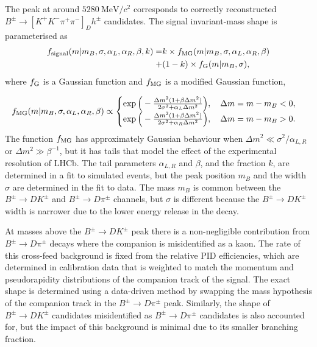 \documentclass[12pt, a4paper, notitlepage, onecolumn]{article}
\begin{document}
The peak at around $\SI{5280}{\mega\eV/c^2}$ corresponds to correctly reconstructed $B^\pm\to[K^+K^-\pi^+\pi^-]_Dh^\pm$ candidates. The signal invariant-mass shape is parameterised as
\begin{equation}
    \begin{aligned}
        f_{\rm signal}(m|m_B, \sigma, \alpha_L, \alpha_R, \beta, k) =& k\times f_{\rm MG}(m|m_B, \sigma, \alpha_L, \alpha_R, \beta) \\
                                                                     +& (1 - k)\times f_{\rm G}(m|m_B, \sigma),
    \end{aligned}
\end{equation}
where $f_{\rm G}$ is a Gaussian function and $f_{\rm MG}$ is a modified Gaussian function,

\begin{equation}
    f_{\rm MG}(m|m_B, \sigma, \alpha_L, \alpha_R, \beta)\propto
    \begin{cases}
        \exp\Big(-\frac{\Delta m^2(1 + \beta\Delta m^2)}{2\sigma^2 + \alpha_L\Delta m^2}\Big), \quad \Delta m = m - m_B < 0, \\
        \exp\Big(-\frac{\Delta m^2(1 + \beta\Delta m^2)}{2\sigma^2 + \alpha_R\Delta m^2}\Big), \quad \Delta m = m - m_B > 0.
    \end{cases}
\end{equation}
The function $f_{\rm MG}$ has approximately Gaussian behaviour when $\Delta m^2\ll\sigma^2/\alpha_{L, R}$ or $\Delta m^2\gg\beta^{-1}$, but it has tails that model the effect of the experimental resolution of LHCb. The tail parameters $\alpha_{L, R}$ and $\beta$, and the fraction $k$, are determined in a fit to simulated events, but the peak position $m_B$ and the width $\sigma$ are determined in the fit to data. The mass $m_B$ is common between the $B^\pm\to DK^\pm$ and $B^\pm\to D\pi^\pm$ channels, but $\sigma$ is different because the $B^\pm\to DK^\pm$ width is narrower due to the lower energy release in the decay.

At masses above the $B^\pm\to DK^\pm$ peak there is a non-negligible contribution from $B^\pm\to D\pi^\pm$ decays where the companion is misidentified as a kaon. The rate of this cross-feed background is fixed from the relative PID efficiencies, which are determined in calibration data that is weighted to match the momentum and pseudorapidity distributions of the companion track of the signal. The exact shape is determined using a data-driven method by swapping the mass hypothesis of the companion track in the $B^\pm\to D\pi^\pm$ peak. Similarly, the shape of $B^\pm\to DK^\pm$ candidates misidentified as $B^\pm\to D\pi^\pm$ candidates is also accounted for, but the impact of this background is minimal due to its smaller branching fraction.
\end{document}
